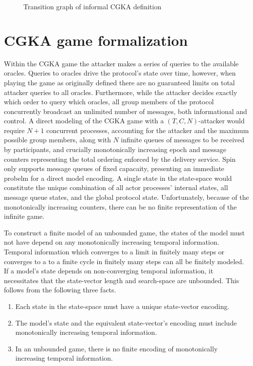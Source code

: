 \begin{figure}[ht!]
  \centering
  \caption{\label{fig:CGKA-informal}Transition graph of informal CGKA definition}
\end{figure}

\hypertarget{sec:game-adaptations}{%
\section{CGKA game formalization}\label{sec:game-adaptations}}

Within the CGKA game the attacker makes a series of queries to the available oracles.
Queries to oracles drive the  protocol's state over time, however, when playing the game as originally defined there are no guaranteed limits on total attacker queries to all oracles.
Furthermore, while the attacker decides exactly which order to query which oracles, all group members of the  protocol concurrently broadcast an unlimited number of messages, both informational and control.
A direct modeling of the CGKA game with a \((T, C, N)\)-attacker would require \(N+1\) concurrent processes, accounting for the attacker and the maximum possible group members, along with \(N\) infinite queues of messages to be received by participants, and crucially monotonically increasing epoch and message counters representing the total ordering enforced by the delivery service.
Spin only supports message queues of fixed capacaity, presenting an immediate probelm for a direct model encoding.
A single state in the state-space would constitute the unique combination of all actor processes' internal states, all message queue states, and the global protocol state.
Unfortunately, because of the monotonically increasing counters, there can be no finite representation of the infinite game.

To construct a finite model of an unbounded game, the states of the model must not have depend on any monotonically increasing temporal information.
Temporal information which converges to a limit in finitely many steps or converges to a to a finite cycle in finitely many steps can all be finitely modeled.
If a model's state depends on non-converging temporal information, it necessitates that the state-vector length and search-space are unbounded.
This follows from the following three facts.

\begin{enumerate}
\def\labelenumi{\arabic{enumi}.}
\item Each state in the state-space must have a unique state-vector encoding.
\item The model's state and the equivalent state-vector's encoding must include monotonically increasing temporal information.
\item In an unbounded game, there is no finite encoding of monotonically increasing temporal information.
\end{enumerate}

